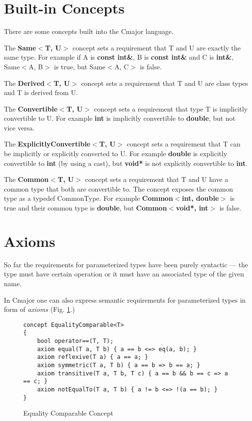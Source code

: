 \documentclass[oneside, a4paper, 11pt]{article}
\begin{document}
\section{Built-in Concepts}

There are some concepts built into the Cmajor language.

The \textbf{Same$<$T, U$>$} concept sets a requirement that T and U are exactly
the same type. For example if A is \textbf{const int\&}, B is \textbf{const int\&} and
C is \textbf{int\&}, Same$<$A, B$>$ is true, but Same$<$A, C$>$ is false.

The \textbf{Derived$<$T, U$>$} concept sets a requirement that T and U are class types and
T is derived from U.

The \textbf{Convertible$<$T, U$>$} concept sets a requirement that type T is implicitly convertible
to U. For example \textbf{int} is implicitly convertible to \textbf{double}, but not vice versa.

The \textbf{ExplicitlyConvertible$<$T, U$>$} concept sets a requirement that T can be implicitly or
explicitly converted to U. For example \textbf{double} is explicitly convertible to \textbf{int}
(by using a cast), but \textbf{void*} is not explicitly convertible to \textbf{int}.

The \textbf{Common$<$T, U$>$} concept sets a requirement that T and U have a common type that both are
convertible to. The concept exposes the common type as a typedef CommonType.
For example \textbf{Common$<$int, double$>$} is true and their common type is \textbf{double},
but \textbf{Common$<$void*, int$>$} is false.

\section{Axioms}

So far the requirements for parameterized types have been purely syntactic ---
the type must have certain operation or it must have an associated type of the given name.

In Cmajor one can also express semantic requirements for parameterized types
in form of \emph{axioms} (Fig. \ref{fig:equalitycomparable}.)

\begin{figure}[htb]\caption{Equality Comparable Concept}\label{fig:equalitycomparable}
\begin{lstlisting}[frame=trBL]
concept EqualityComparable<T>
{
    bool operator==(T, T);
    axiom equal(T a, T b) { a == b <=> eq(a, b); }
    axiom reflexive(T a) { a == a; }
    axiom symmetric(T a, T b) { a == b => b == a; }
    axiom transitive(T a, T b, T c) { a == b && b == c => a == c; }
    axiom notEqualTo(T a, T b) { a != b <=> !(a == b); }
}
\end{lstlisting}
\end{figure}
\end{document}
